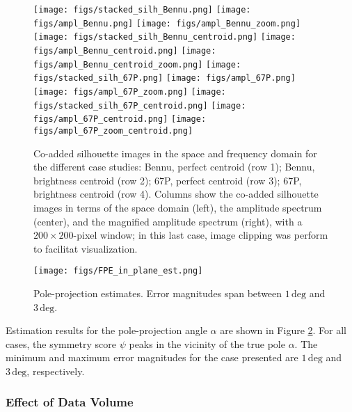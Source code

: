 \begin{figure}
    \centering
    \texttt{[image: figs/stacked\_silh\_Bennu.png]}
    \texttt{[image: figs/ampl\_Bennu.png]}
    \texttt{[image: figs/ampl\_Bennu\_zoom.png]}
    \texttt{[image: figs/stacked\_silh\_Bennu\_centroid.png]}
    \texttt{[image: figs/ampl\_Bennu\_centroid.png]}
    \texttt{[image: figs/ampl\_Bennu\_centroid\_zoom.png]}
    \texttt{[image: figs/stacked\_silh\_67P.png]}
    \texttt{[image: figs/ampl\_67P.png]}
    \texttt{[image: figs/ampl\_67P\_zoom.png]}
    \texttt{[image: figs/stacked\_silh\_67P\_centroid.png]}
    \texttt{[image: figs/ampl\_67P\_centroid.png]}
    \texttt{[image: figs/ampl\_67P\_zoom\_centroid.png]}
    \caption{Co-added silhouette images in the space and frequency domain for the different case studies: Bennu, perfect centroid (row 1); Bennu, brightness centroid (row 2); 67P, perfect centroid (row 3); 67P, brightness centroid (row 4). Columns show the co-added silhouette images in terms of the space domain (left), the amplitude spectrum (center), and the magnified amplitude spectrum (right), with a $200\times 200$-pixel window; in this last case, image clipping was perform to facilitat visualization.}
    \label{fig:ampl_spectr}
\end{figure}

\begin{figure}
    \centering
    \texttt{[image: figs/FPE\_in\_plane\_est.png]}
    \caption{Pole-projection estimates. Error magnitudes span between $1\,\mathrm{deg}$ and $3\,\mathrm{deg}$.}
    \label{fig:in_plane_est}
\end{figure}

Estimation results for the pole-projection angle $\alpha$ are shown in Figure \ref{fig:in_plane_est}. For all cases, the symmetry score $\psi$ peaks in the vicinity of the true pole $\alpha$. The minimum and maximum error magnitudes for the case presented are $1\,\mathrm{deg}$ and $3\,\mathrm{deg}$, respectively.

\subsubsection{Effect of Data Volume}

